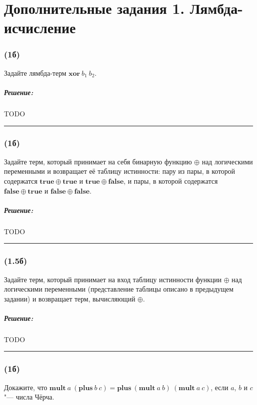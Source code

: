 \documentclass{article}
\newenvironment{proof}{\subparagraph{\hspace{-1em}Решение:\newline}}{\par\noindent\rule{\textwidth}{0.4pt}}
\begin{document}
    \section*{Дополнительные задания 1. Лямбда-исчисление}

    \subsubsection{(1б)}

    Задайте лямбда-терм $\mathbf{xor}~b_1~b_2$.

    \begin{proof}
        TODO %
    \end{proof}

    \subsubsection{(1б)}

    Задайте терм, который принимает на себя бинарную функцию $\oplus$ над
    логическими переменными и возвращает её таблицу истинности: пару из
    пары, в которой содержатся $\mathbf{true} \oplus \mathbf{true}$ и
    $\mathbf{true} \oplus \mathbf{false}$, и пары, в которой содержатся
    $\mathbf{false} \oplus \mathbf{true}$ и $\mathbf{false} \oplus
    \mathbf{false}$.

    \begin{proof}
        TODO %
    \end{proof}

    \subsubsection{(1.5б)}

    Задайте терм, который принимает на вход таблицу истинности функции
    $\oplus$ над логическими переменными (представление таблицы описано в
    предыдущем задании) и возвращает терм, вычисляющий $\oplus$.

    \begin{proof}
        TODO %
    \end{proof}

    \subsubsection{(1б)}

    Докажите, что $\mathbf{mult}~a~(\mathbf{plus}~b~c) =
    \mathbf{plus}~(\mathbf{mult}~a~b)~(\mathbf{mult}~a~c)$, если $a$, $b$ и $c$ "---
    числа Чёрча.
\end{document}
